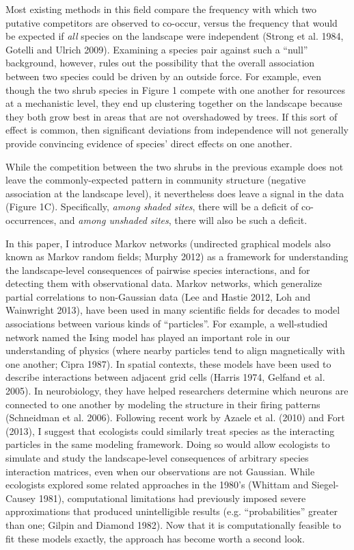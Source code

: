 \documentclass[12pt,]{article}
\begin{document}
\begin{spacing}{1.9}
\begin{flushleft}
Most existing methods in this field compare the frequency with which two
putative competitors are observed to co-occur, versus the frequency that
would be expected if \emph{all} species on the landscape were
independent (Strong et al. 1984, Gotelli and Ulrich 2009). Examining a
species pair against such a ``null'' background, however, rules out the
possibility that the overall association between two species could be
driven by an outside force. For example, even though the two shrub
species in Figure 1 compete with one another for resources at a
mechanistic level, they end up clustering together on the landscape
because they both grow best in areas that are not overshadowed by trees.
If this sort of effect is common, then significant deviations from
independence will not generally provide convincing evidence of species'
direct effects on one another.

While the competition between the two shrubs in the previous example
does not leave the commonly-expected pattern in community structure
(negative association at the landscape level), it nevertheless does
leave a signal in the data (Figure 1C). Specifically, \emph{among shaded
sites}, there will be a deficit of co-occurrences, and \emph{among
unshaded sites}, there will also be such a deficit.

In this paper, I introduce Markov networks (undirected graphical models
also known as Markov random fields; Murphy 2012) as a framework for
understanding the landscape-level consequences of pairwise species
interactions, and for detecting them with observational data. Markov
networks, which generalize partial correlations to non-Gaussian data
(Lee and Hastie 2012, Loh and Wainwright 2013), have been used in many
scientific fields for decades to model associations between various
kinds of ``particles''. For example, a well-studied network named the
Ising model has played an important role in our understanding of physics
(where nearby particles tend to align magnetically with one another;
Cipra 1987). In spatial contexts, these models have been used to
describe interactions between adjacent grid cells (Harris 1974, Gelfand
et al. 2005). In neurobiology, they have helped researchers determine
which neurons are connected to one another by modeling the structure in
their firing patterns (Schneidman et al. 2006). Following recent work by
Azaele et al. (2010) and Fort (2013), I suggest that ecologists could
similarly treat species as the interacting particles in the same
modeling framework. Doing so would allow ecologists to simulate and
study the landscape-level consequences of arbitrary species interaction
matrices, even when our observations are not Gaussian. While ecologists
explored some related approaches in the 1980's (Whittam and
Siegel-Causey 1981), computational limitations had previously imposed
severe approximations that produced unintelligible results (e.g.
``probabilities'' greater than one; Gilpin and Diamond 1982). Now that
it is computationally feasible to fit these models exactly, the approach
has become worth a second look.


\end{flushleft}
\end{spacing}
\end{document}
